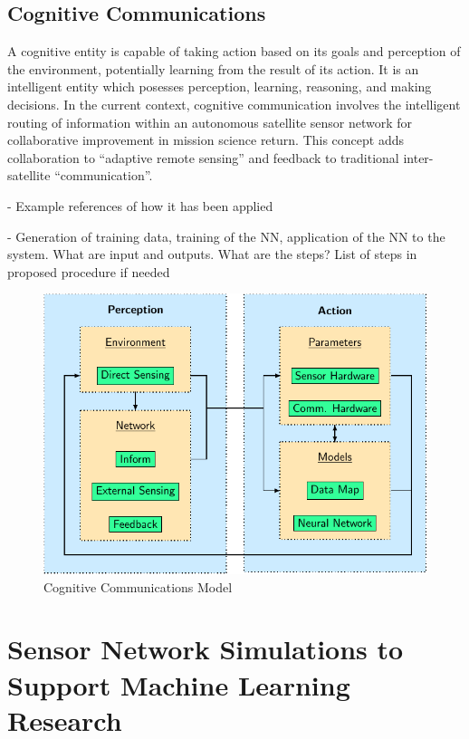 \documentclass[conference]{IEEEtran}
\begin{document}
\subsection{Cognitive Communications}
\label{ssec:cognit}

A cognitive entity is capable of taking action based on its goals and perception
of the environment, potentially learning from the result of its action.  It is
an intelligent entity which posesses perception, learning, reasoning, and making
decisions.  In the current context, cognitive communication involves the
intelligent routing of information within an autonomous satellite sensor network
for collaborative improvement in mission science return.  This concept adds
collaboration to ``adaptive remote sensing'' and feedback to traditional
inter-satellite ``communication''.

{
  \color{red}
  - Example references of how it has been applied

  - Generation of training data, training of the NN, application of the NN to
  the system. What are input and outputs. What are the steps? List of steps in
  proposed procedure if needed
}
\begin{figure}[t]
  \centerline{\includegraphics[width=0.9\linewidth]{images/working/flowchart.pdf}}
  \caption{Cognitive Communications Model}
  \label{fig:model}
\end{figure}

\vfill


\section{Sensor Network Simulations to Support Machine Learning Research}
\label{sec:software}
\end{document}
